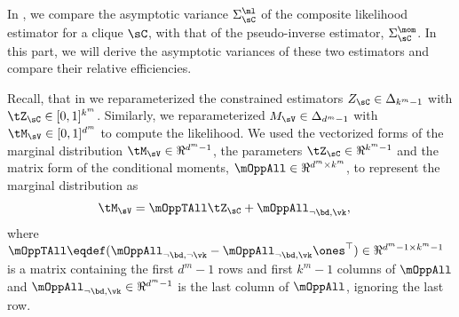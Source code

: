 \subsection{}
\label{app:pw-proof}

In , we compare the asymptotic variance
  $\Sigma^\ml_\sC$ of the composite likelihood estimator for a clique
  $\sC$, with that of the pseudo-inverse estimator, $\Sigma^\mom_\sC$. 
In this part, we will derive the asymptotic variances of these two
  estimators and compare their relative efficiencies.

Recall, that in  we reparameterized the
  constrained estimators $Z_\sC \in \Delta_{k^m-1}$ with $\tZ_\sC \in
  [0,1]^{k^m}$. 
Similarly, we reparameterized $M_\sV \in \Delta_{d^m - 1}$ with
  $\tM_\sV \in [0,1]^{d^m}$ to compute
  the likelihood.
We used the vectorized forms of the marginal distribution $\tM_\sV \in
  \Re^{d^m - 1}$, the parameters $\tZ_\sC \in \Re^{k^m-1}$ and the
  matrix form of the conditional moments, $\mOppAll \in \Re^{d^m \times
  k^m}$, to represent the marginal distribution as
\begin{align*}
  \tM_\sV &= \mOppTAll \tZ_\sC + \mOppAll_{\neg \bd, \vk},
\end{align*}
where $\mOppTAll \eqdef (\mOppAll_{\neg \bd, \neg \vk}
- \mOppAll_{\neg \bd, \vk}\ones^\top) \in \Re^{d^m - 1 \times
k^m - 1}$ is a matrix containing the first $d^m-1$ rows and first $k^m-1$ columns of $\mOppAll$
and $\mOppAll_{\neg \bd, \vk} \in \Re^{d^m-1}$ is the last column of
$\mOppAll$, ignoring the last row.

